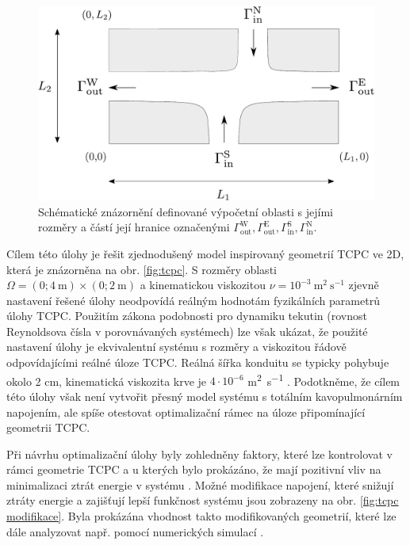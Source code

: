 \vspace{-1mm}
\begin{figure}[H]
	\centering
	\includegraphics[width=0.61	\textwidth]{Images/krizovatka-obecna.pdf}
	\caption{Schématické znázornění definované výpočetní oblasti s jejími rozměry a částí její hranice označenými $ \Gamma^{\mathrm{W}}_{\mathrm{out}}, \Gamma^{\mathrm{E}}_{\mathrm{out}}, \Gamma^{\mathrm{S}}_{\mathrm{in}}, \Gamma^{\mathrm{N}}_{\mathrm{in}} $.}
	\label{fig:tcpc oblast}
	\vspace{1.8mm}
\end{figure}

Cílem této úlohy je řešit zjednodušený model inspirovaný geometrií TCPC ve 2D, která je znázorněna na obr. \ref{fig:tcpc}. S rozměry oblasti $ \Omega=(0 ; 4 \mathrm{~m}) \times(0 ; 2\mathrm{~m})$ a kinematickou viskozitou \mbox{$ \nu=10^{-3} \mathrm{~m}^{2} \mathrm{~s}^{-1}$} zjevně nastavení řešené úlohy neodpovídá reálným hodnotám fyzikálních parametrů úlohy TCPC. Použitím zákona podobnosti pro dynamiku tekutin (rovnost Reynoldsova čísla v porovnávaných systémech) lze však ukázat, že použité nastavení úlohy je ekvivalentní systému s rozměry a viskozitou řádově odpovídajícími reálné úloze TCPC. Reálná šířka konduitu se typicky pohybuje okolo 2 cm, kinematická viskozita krve je $ 4 \cdot 10^{-6} $ \si{m^2.s^{-1}} \cite{Rijnberg2018}. Podotkněme, že cílem této úlohy však není vytvořit přesný model systému s totálním kavopulmonárním napojením, ale spíše otestovat optimalizační rámec na úloze připomínající geometrii TCPC.

Při návrhu optimalizační úlohy byly zohledněny faktory, které lze kontrolovat v rámci geometrie TCPC a u kterých bylo prokázáno, že mají pozitivní vliv na minimalizaci ztrát energie v systému \cite{Rijnberg2018}. Možné modifikace napojení, které snižují ztráty energie a zajišťují lepší funkčnost systému jsou zobrazeny na obr. \ref{fig:tcpc modifikace}. Byla prokázána vhodnost takto modifikovaných geometrií, které lze dále analyzovat např. pomocí numerických simulací \cite{Rijnberg2018, Porfiryev2020, Ensley1999}.


